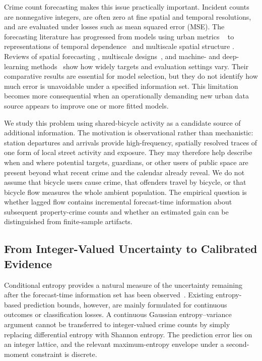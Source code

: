 \documentclass[applsci,article,accept,moreauthors]{Definitions/mdpi}
\def\hl#1{#1}%
\begin{document}
Crime count forecasting makes this issue practically important.
Incident counts are nonnegative integers, are often zero at fine spatial and
temporal resolutions, and are evaluated under losses such as mean squared
error (MSE). {The forecasting literature has progressed from models using
urban \hl{metrics} %
~\citep{alves2018crime} to representations of temporal
dependence~\citep{huang2018deepcrime} and multiscale spatial structure
\citep{jing2024multiscale}. Reviews of spatial forecasting
\citep{kounadi2020review}, multiscale designs~\citep{du2023review}, and
machine- and deep-learning methods~\citep{mandalapu2023review} show how
widely targets and evaluation settings vary.} Their comparative results are essential for model selection,
but they do not identify how much error is unavoidable under a specified
information set. This limitation becomes more consequential when an
operationally demanding new urban data source appears to improve one or more
fitted models.

{We study this problem using shared-bicycle activity as a candidate source
of additional information. The motivation is observational rather than
mechanistic: station departures and arrivals provide high-frequency,
spatially resolved traces of one form of local street activity and exposure.
They may therefore help describe when and where potential targets, guardians,
or other users of public space are present beyond what recent crime and the
calendar already reveal. We do not assume that bicycle users cause crime, that
offenders travel by bicycle, or that bicycle flow measures the whole ambient
population. The empirical question is whether lagged flow contains incremental
forecast-time information about subsequent property-crime counts and whether
an estimated gain can be distinguished from finite-sample artifacts.}

\subsection{From Integer-Valued Uncertainty to Calibrated Evidence}
\label{subsec:intro_calibrated_evidence}

Conditional entropy provides a natural measure of the uncertainty remaining
after the forecast-time information set has been observed~\citep{shannon1948,cover_thomas}. Existing entropy-based prediction bounds,
however, are mainly formulated for continuous outcomes or classification
losses. A continuous Gaussian entropy--variance argument cannot be transferred
to integer-valued crime counts by simply replacing differential entropy with
Shannon entropy. The prediction error lies on an integer lattice, and the
relevant maximum-entropy envelope under a second-moment constraint is
discrete.
\end{document}
